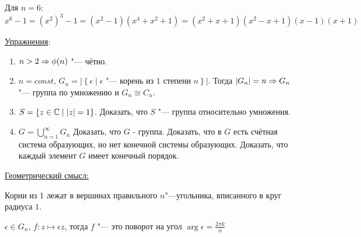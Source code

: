 Для $n = 6$:
$$x^6 -1 = (x^2)^3 - 1 = (x^2 - 1)(x^4 + x^2 + 1) = (x^2 + x + 1)(x^2 - x + 1)(x - 1)(x + 1)$$

\underline{Упражнения}:
\begin{enumerate}
\item $n > 2 \Rightarrow \phi(n)$ "--- чётно.
\item $n = const$, $G_n = \left|\left\{\epsilon \mid \text{$\epsilon$ "--- корень из $1$ степени $n$}\right\}\right|$. Тогда $|G_n| = n \Rightarrow G_n$ "--- группа по умножению и $G_n \cong C_n$.
\item $S = \{z \in \mathbb{C} \mid |z| = 1\}$. Доказать, что $S$ "--- группа относительно умножения.
\item $G = \bigcup\limits_{n = 1}^{\infty} G_n$ Доказать, что $G$ - группа. Доказать, что в $G$ есть счётная система образующих, но нет конечной системы образующих. Доказать, что каждый элемент $G$ имеет конечный порядок. 
\end{enumerate}

\underline{Геометрический смысл:}
\begin{center}
\def\svgwidth{6.0cm}

\end{center}
Корни из 1 лежат в вершинах правильного $n$"---угольника, вписанного в круг радиуса $1$.

$\epsilon \in G_n$, $f\colon z \mapsto \epsilon z$, тогда $f$ "--- это поворот на угол $\arg \epsilon = \frac{2 \pi k}n$